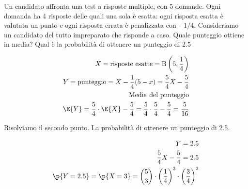 \begin{exrc}
    Un candidato affronta una test a risposte multiple, con 5 domande. Ogni domanda ha 4 risposte delle quali una sola \`e esatta: ogni risposta esatta \`e valutata un punto e ogni risposta errata \`e penalizzata con \(-1/4\). Consideriamo un candidato del tutto impreparato che risponde a caso. Quale punteggio ottiene in media? Qual \`e la probabilit\`a di ottenere un punteggio di 2.5

    \begin{equation*}
        \begin{aligned}
            X = \text{risposte esatte} = \text{B}\left(5,\frac{1}{4}\right) \\
            Y = \text{punteggio} = X - \frac{1}{4} (5-x) = \frac{5}{4}X - \frac{5}{4} \\
            \text{Media del punteggio} \\
            \E{Y} = \frac{5}{4} \cdot \E{X} - \frac{5}{4} = \frac{5}{4} \cdot \frac{5}{4} - \frac{5}{4} = \frac{5}{16} \\
        \end{aligned}
    \end{equation*}

    Risolviamo il secondo punto. La probabilit\`a di ottenere un punteggio di 2.5.

    \begin{equation*}
        \begin{aligned}
            Y = 2.5 \\
            \frac{5}{4}X - \frac{5}{4} = 2.5 \\
            \p{Y = 2.5} = \p{X = 3} = \binom{5}{3} \cdot \left( \frac{1}{4} \right)^3 \cdot \left( \frac{3}{4} \right)^2
        \end{aligned}
    \end{equation*}

\end{exrc}